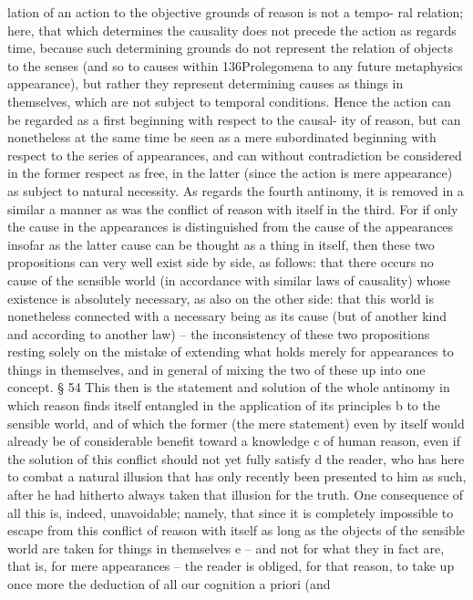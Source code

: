 lation of an action to the objective grounds of reason is not a tempo-
ral relation; here, that which determines the causality does not precede
the action as regards time, because such determining grounds do not
represent the relation of objects to the senses (and so to causes within
136Prolegomena to any future metaphysics
appearance), but rather they represent determining causes as things in
themselves, which are not subject to temporal conditions. Hence the
action can be regarded as a ﬁrst beginning with respect to the causal-
ity of reason, but can nonetheless at the same time be seen as a mere
subordinated beginning with respect to the series of appearances, and
can without contradiction be considered in the former respect as free,
in the latter (since the action is mere appearance) as subject to natural
necessity.
As regards the fourth antinomy, it is removed in a similar a manner
as was the conﬂict of reason with itself in the third. For if only the
cause in the appearances is distinguished from the cause of the appearances
insofar as the latter cause can be thought as a thing in itself, then these
two propositions can very well exist side by side, as follows: that there
occurs no cause of the sensible world (in accordance with similar laws
of causality) whose existence is absolutely necessary, as also on the other
side: that this world is nonetheless connected with a necessary being
as its cause (but of another kind and according to another law) – the
inconsistency of these two propositions resting solely on the mistake of
extending what holds merely for appearances to things in themselves,
and in general of mixing the two of these up into one concept.
§ 54
This then is the statement and solution of the whole antinomy in which
reason ﬁnds itself entangled in the application of its principles b to the
sensible world, and of which the former (the mere statement) even by
itself would already be of considerable beneﬁt toward a knowledge c of
human reason, even if the solution of this conﬂict should not yet fully
satisfy d the reader, who has here to combat a natural illusion that has
only recently been presented to him as such, after he had hitherto always
taken that illusion for the truth. One consequence of all this is, indeed,
unavoidable; namely, that since it is completely impossible to escape from
this conﬂict of reason with itself as long as the objects of the sensible
world are taken for things in themselves e – and not for what they in fact
are, that is, for mere appearances – the reader is obliged, for that reason,
to take up once more the deduction of all our cognition a priori (and
